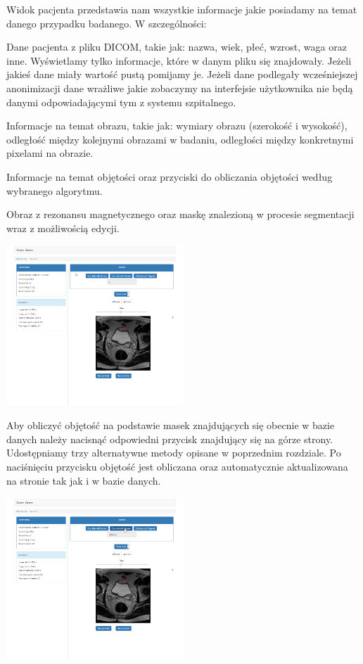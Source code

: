 \documentclass[a4paper,11pt,twoside]{report}
\theoremstyle{definition}
\begin{document}
Widok pacjenta przedstawia nam wszystkie informacje jakie posiadamy na temat danego przypadku badanego. W szczególności:
\begin{description}
\item Dane pacjenta z pliku DICOM, takie jak: nazwa, wiek, płeć, wzrost, waga oraz inne. Wyświetlamy tylko informacje, które w danym pliku się znajdowały. Jeżeli jakieś dane miały wartość pustą pomijamy je. Jeżeli dane podlegały wcześniejszej anonimizacji dane wrażliwe jakie zobaczymy na interfejsie użytkownika nie będą danymi odpowiadającymi tym z systemu szpitalnego.
\item Informacje na temat obrazu, takie jak: wymiary obrazu (szerokość i wysokość), odległość między kolejnymi obrazami w badaniu, odległości między konkretnymi pixelami na obrazie.
\item Informacje na temat objętości oraz przyciski do obliczania objętości według wybranego algorytmu.
\item Obraz z rezonansu magnetycznego oraz maskę znalezioną w procesie segmentacji wraz z możliwością edycji.
\end{description}

\begin{minipage}[h]{\linewidth}
	\centering
	\includegraphics[width=0.5\textwidth]{FrontScreen/Patient/22.png}
\end{minipage}

Aby obliczyć objętość na podstawie masek znajdujących się obecnie w bazie danych należy nacisnąć odpowiedni przycisk znajdujący się na górze strony. Udostępniamy trzy alternatywne metody opisane w poprzednim rozdziale. Po naciśnięciu przycisku objętość jest obliczana oraz automatycznie aktualizowana na stronie tak jak i w bazie danych.

\begin{minipage}[h]{\linewidth}
	\centering
	\includegraphics[width=0.5\textwidth]{FrontScreen/Patient/343.png}
\end{minipage}
\end{document}
